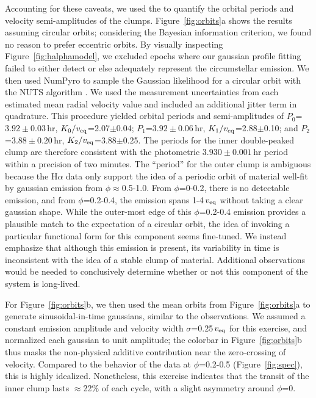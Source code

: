 \documentclass[11pt,twocolumn,tighten,linenumbers]{aastex7}
\begin{document}
Accounting for these caveats, we used the to quantify the orbital periods and
velocity semi-amplitudes of the clumps.  Figure~\ref{fig:orbits}a
shows the results assuming circular orbits; considering the Bayesian
information criterion, we found no reason to prefer eccentric orbits.
By visually inspecting Figure~\ref{fig:halphamodel}, we
excluded epochs where our gaussian profile fitting failed to either
detect or else adequately represent the circumstellar emission.  We
then used NumPyro to sample the Gaussian likelihood for a circular
orbit with the NUTS algorithm \citep{Phan2019}.  We used the
measurement uncertainties from each estimated mean radial velocity
value and included an additional jitter term in quadrature.  This
procedure yielded orbital periods and semi-amplitudes of
$P_0$=$3.92\pm0.03$\,hr, $K_0/v_{\rm eq}$=2.07$\pm$0.04;
$P_1$=$3.92\pm0.06$\,hr, $K_1/v_{\rm eq}$=2.88$\pm$0.10;
and $P_2$=$3.88\pm0.20$\,hr, $K_2/v_{\rm eq}$=3.88$\pm$0.25.
The periods for the inner double-peaked clump are therefore consistent
with the photometric $3.930\pm0.001$\,hr period within a precision of
two minutes.  The ``period'' for the outer clump is ambiguous because
the H$\alpha$ data only support the idea of a periodic orbit of
material well-fit by gaussian emission from $\phi$$\approx$0.5-1.0.
From $\phi$=0-0.2, there is no detectable emission, and from
$\phi$=0.2-0.4, the emission spans 1-4\,$v_{\rm eq}$ without taking a
clear gaussian shape.  While the outer-most edge of this
$\phi$=0.2-0.4 emission provides a plausible match to the expectation
of a circular orbit, the idea of invoking a particular functional form
for this component seems fine-tuned.  We instead emphasize that
although this emission is present, its variability in time is
inconsistent with the idea of a stable clump of material.  Additional
observations would be needed to conclusively determine whether or not
this component of the system is long-lived.

For Figure~\ref{fig:orbits}b, we then used the mean orbits from
Figure~\ref{fig:orbits}a to generate sinusoidal-in-time gaussians,
similar to the observations.  We assumed a constant emission amplitude
and velocity width $\sigma$=0.25\,$v_{\rm eq}$ for this exercise, and
normalized each gaussian to unit amplitude;  the colorbar in
Figure~\ref{fig:orbits}b thus masks the non-physical additive
contribution near the zero-crossing of velocity.  Compared to the
behavior of the data at $\phi$=0.2-0.5 (Figure~\ref{fig:spec}), this
is highly idealized.  Nonetheless, this exercise indicates that the
transit of the inner clump lasts $\approx$22\% of each cycle, with a
slight asymmetry around $\phi$=0.
\end{document}
